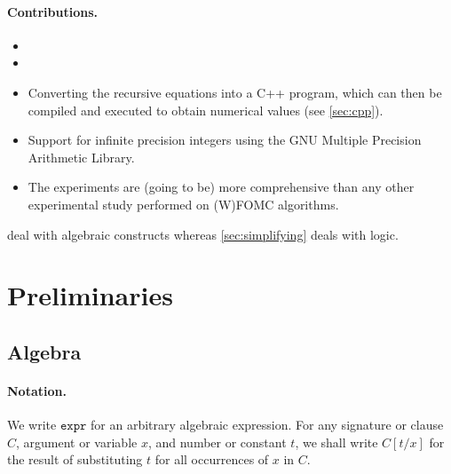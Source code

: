 \documentclass{article}
\newcommand{\expr}{\mathtt{expr}}
\begin{document}
\paragraph{Contributions.}
\begin{itemize}
  \item {}
  \item {}
  \item Converting the recursive equations into a C++ program, which can then be
        compiled and executed to obtain numerical values (see \cref{sec:cpp}).
  \item Support for infinite precision integers using the GNU Multiple Precision
        Arithmetic Library.
  \item The experiments are (going to be) more comprehensive than any other
        experimental study performed on (W)FOMC algorithms.
\end{itemize}


 deal with algebraic constructs whereas
\cref{sec:simplifying} deals with logic.

\section{Preliminaries}

\subsection{Algebra}

\paragraph{Notation.}
We write $\expr{}$ for an arbitrary algebraic expression. For any signature or
clause $C$, argument or variable $x$, and number or constant $t$, we shall write
$C[t / x]$ for the result of substituting $t$ for all occurrences of $x$ in $C$.

\end{document}
